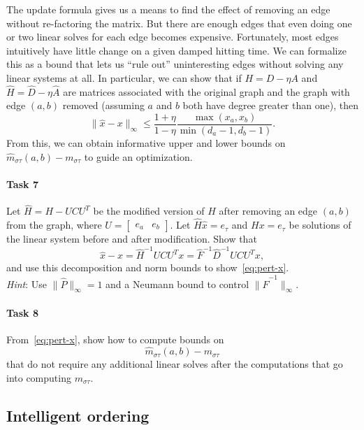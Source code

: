 \documentclass[12pt, leqno]{article}
\begin{document}
The update formula gives us a means to find the effect of removing an
edge without re-factoring the matrix.  But there are enough edges that
even doing one or two linear solves for each edge becomes expensive.
Fortunately, most edges intuitively have little change on a given
damped hitting time.  We can formalize this as a bound that lets us
``rule out'' uninteresting edges without solving any linear systems at
all.  In particular, we can show that if $H = D-\eta A$ and
$\hat{H} = \hat{D} - \eta \hat{A}$ are matrices associated with the
original graph and the graph with edge $(a,b)$ removed (assuming $a$
and $b$ both have degree greater than one), then
\begin{equation} \label{eq:pert-x}
\|\hat{x}-x\|_{\infty} \leq
  \frac{1+\eta}{1-\eta}
  \frac{\max(x_a, x_b)}{\min(d_a-1, d_b-1)}.
\end{equation}
From this, we can obtain informative upper and lower bounds on
$\hat{m}_{\sigma \tau}(a,b)-m_{\sigma \tau}$ to guide an optimization.

\paragraph*{Task 7}
Let $\hat{H} = H - UCU^T$ be the modified version of $H$ after
removing an edge $(a,b)$ from the graph,
where $U = \begin{bmatrix} e_a & e_b \end{bmatrix}$.  Let
$\hat{H} \hat{x} = e_{\tau}$ and $Hx = e_{\tau}$ be solutions
of the linear system before and after modification.
Show that
\[
  \hat{x}-x = \hat{H}^{-1} UCU^T x = \hat{F}^{-1} \hat{D}^{-1} U C U^T x,
\]
and use this decomposition and norm bounds to show~\eqref{eq:pert-x}. \\[1mm]
{\em Hint}: Use $\|\hat{P}\|_\infty = 1$ and a Neumann
bound to control $\|\hat{F}^{-1}\|_\infty$.

\paragraph*{Task 8}
From~\eqref{eq:pert-x}, show how to compute bounds on
\[
  \hat{m}_{\sigma \tau}(a,b) - m_{\sigma \tau}
\]
that do not require any additional linear solves after
the computations that go into computing $m_{\sigma \tau}$.

\subsection*{Intelligent ordering}
\end{document}
